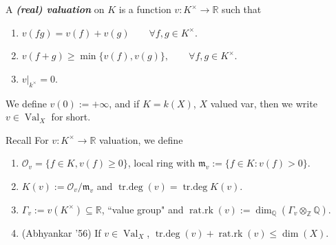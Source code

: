 A  \textit{\textbf{(real) valuation}} on \(K\) is a function \(v:K^\times \longrightarrow \mathbb{R}\) such that
\begin{enumerate}
\item \(v(fg)=v(f)+v(g)\qquad \forall f,g \in K^\times\).
\item \(v(f+g) \geq \operatorname{min}\{v(f),v(g)\}, \qquad \forall f,g \in K^\times\).
\item \(v|_{k^\times}=0\).
\end{enumerate}
We define \(v(0):=+\infty\), and if \(K=k(X)\),  \(X\) valued var, then we write  \(v \in \operatorname{V a l}_X\) for short.

\begin{thing7}{Recall}\leavevmode
For \(v: K^\times \longrightarrow \mathbb{R}\) valuation, we define
\begin{enumerate}
\item \(\mathcal{O}_v=\{f \in K, v(f) \geq 0\}\), local ring with \(\mathfrak{m}_v:=\{f \in K: v(f)>0\}\).
\item \(K(v):= \mathcal{O}_v/\mathfrak{m}_v\) and \(\operatorname{tr.de g}(v)=\operatorname{tr.de g}K(v)\).
\item \(\Gamma_v:=v(K^\times) \subseteq \mathbb{R}\), ``value group" and \(\operatorname{ra t.r k}(v):=\dim_\mathbb{Q}(\Gamma_v \otimes_{\mathbb{Z}}\mathbb{Q})\).
\item (Abhyankar '56) If \(v \in \operatorname{Val}_X\), \(\operatorname{tr.de g}(v)+\operatorname{r a t.r k}(v)\leq \dim(X)\).
\end{enumerate}
\end{thing7}


